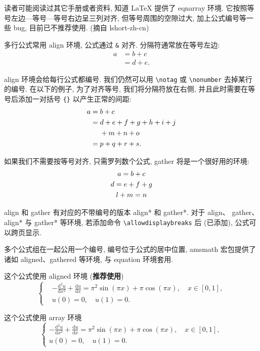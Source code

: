 \documentclass[master,print]{shnuthesis}
\begin{document}
读者可能阅读过其它手册或者资料, 知道 LaTeX 提供了 eqnarray 环境. 它按照等号左边—等号—等号右边呈三列对齐, 但等号周围的空隙过大, 加上公式编号等一些 bug, 目前已不推荐使用. (摘自 lshort-zh-cn)

多行公式常用 align 环境, 公式通过 \verb|&| 对齐. 分隔符通常放在等号左边:
\begin{align}
a & = b + c \\
& = d + e.
\end{align}

align 环境会给每行公式都编号. 我们仍然可以用 \verb|\notag| 或 \verb|\nonumber| 去掉某行的编号. 在以下的例子,
为了对齐等号, 我们将分隔符放在右侧, 并且此时需要在等号后添加一对括号 \verb|{}| 以产生正常的间距:
\begin{align}
a ={} & b + c \\
={} & d + e + f + g + h + i + j \notag \\
& + m + n + o \\
={} & p + q + r + s.
\end{align}

如果我们不需要按等号对齐, 只需罗列数个公式, gather 将是一个很好用的环境:
\begin{gather}
a = b + c \\
d = e + f + g \notag \\
l + m = n
\end{gather}

align 和 gather 有对应的不带编号的版本 align* 和 gather*.
对于 align、 gather、align* 与 gather* 等环境, 若添加命令 \verb|\allowdisplaybreaks| 后 (已添加), 公式可以跨页显示.

多个公式组在一起公用一个编号, 编号位于公式的居中位置, amsmath 宏包提供了诸如 aligned、gathered 等环境, 与 equation 环境套用.

这个公式使用 aligned 环境 (\textbf{推荐使用})
\begin{equation}\label{eqn:1}
\left\{\begin{aligned}
  &-\frac{\mathrm{d}^{2} u}{\mathrm{d} x^{2}}+\frac{\mathrm{d} u}{\mathrm{d} x}=\pi^{2} \sin (\pi x)+\pi \cos (\pi x),\quad x \in [0,1], \\
  &u(0)=0,\quad u(1)=0.
\end{aligned} \right.
\end{equation}

这个公式使用 array 环境
\begin{equation}\label{eqn:2}
\left\{\begin{array}{l}
\displaystyle
-\frac{\mathrm{d}^{2} u}{\mathrm{d} x^{2}}+\frac{\mathrm{d} u}{\mathrm{d} x}=\pi^{2} \sin (\pi x)+\pi \cos (\pi x),\quad x \in [0,1], \\[6pt]
u(0)=0,\quad u(1)=0.
\end{array} \right.
\end{equation}
\end{document}
